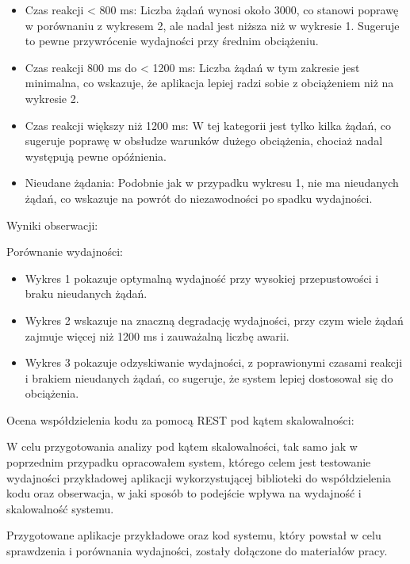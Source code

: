 \documentclass[runningheads,12pt]{llncs}
\begin{document}
\begin{itemize} 
    \item Czas reakcji < 800 ms: Liczba żądań wynosi około 3000, co stanowi poprawę w porównaniu z wykresem 2, ale nadal jest niższa niż w wykresie 1. Sugeruje to pewne przywrócenie wydajności przy średnim obciążeniu.
    \item Czas reakcji 800 ms do < 1200 ms: Liczba żądań w tym zakresie jest minimalna, co wskazuje, że aplikacja lepiej radzi sobie z obciążeniem niż na wykresie 2.
    \item Czas reakcji większy niż 1200 ms: W tej kategorii jest tylko kilka żądań, co sugeruje poprawę w obsłudze warunków dużego obciążenia, chociaż nadal występują pewne opóźnienia.
    \item Nieudane żądania: Podobnie jak w przypadku wykresu 1, nie ma nieudanych żądań, co wskazuje na powrót do niezawodności po spadku wydajności.
\end{itemize}

Wyniki obserwacji:

Porównanie wydajności: 

\begin{itemize} 
    \item Wykres 1 pokazuje optymalną wydajność przy wysokiej przepustowości i braku nieudanych żądań.
    \item Wykres 2 wskazuje na znaczną degradację wydajności, przy czym wiele żądań zajmuje więcej niż 1200 ms i zauważalną liczbę awarii.
    \item Wykres 3 pokazuje odzyskiwanie wydajności, z poprawionymi czasami reakcji i brakiem nieudanych żądań, co sugeruje, że system lepiej dostosował się do obciążenia.
\end{itemize}

\newpage



Ocena współdzielenia kodu za pomocą REST pod kątem skalowalności:

W celu przygotowania analizy pod kątem skalowalności, tak samo jak w poprzednim przypadku opracowałem system, którego celem jest testowanie wydajności przykładowej aplikacji wykorzystującej biblioteki do współdzielenia kodu oraz obserwacja, w jaki sposób to podejście wpływa na wydajność i skalowalność systemu.

Przygotowane aplikacje przykładowe oraz kod systemu, który powstał w celu sprawdzenia i porównania wydajności, zostały dołączone do materiałów pracy.
\end{document}
